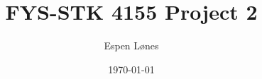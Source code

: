 \documentclass[12pt, letterpaper, twoside]{article}
\begin{document}
\title{FYS-STK 4155 Project 2 }
\author{Espen Lønes}
\date{\today}
\maketitle
\end{document}
